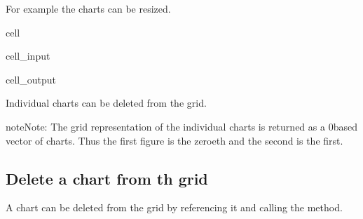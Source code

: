 \documentclass[letterpaper,10pt,english]{jupyterBook}
\begin{document}
\sphinxAtStartPar
For example the charts can be resized.

\begin{sphinxuseclass}{cell}\begin{sphinxVerbatimInput}

\begin{sphinxuseclass}{cell_input}
\begin{sphinxVerbatim}[commandchars=\\\{\}]
\end{sphinxVerbatim}

\end{sphinxuseclass}\end{sphinxVerbatimInput}
\begin{sphinxVerbatimOutput}

\begin{sphinxuseclass}{cell_output}
\noindent{}

\end{sphinxuseclass}\end{sphinxVerbatimOutput}

\end{sphinxuseclass}
\sphinxAtStartPar
Individual charts can be deleted from the grid.

\begin{sphinxadmonition}{note}{Note:}
\sphinxAtStartPar
The grid representation of the individual charts is returned as a 0\sphinxhyphen{}based vector of charts.  Thus the first figure is the zeroeth and the second is the first.
\end{sphinxadmonition}


\subsection{Delete a chart from th grid}
\label{\detokenize{content/05_WBModels/ScenarioAnalysis:delete-a-chart-from-th-grid}}
\sphinxAtStartPar
A chart can be deleted from the grid by referencing it and calling the  method.
\end{document}
